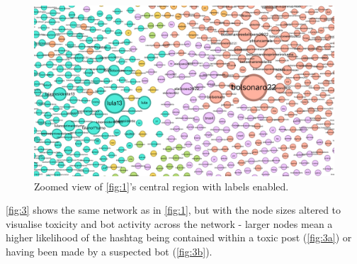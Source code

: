 \documentclass[a4paper,11pt]{article}  %
\begin{document}
	\begin{figure}%
		\centering
		\includegraphics[height=0.3\textheight]{images/net_mod_app_detail}
		\caption{Zoomed view of \autoref{fig:1}'s central region with labels enabled.}
		\label{fig:2}
	\end{figure}

	\autoref{fig:3} shows the same network as in \autoref{fig:1}, but with the node sizes altered to visualise toxicity and bot activity across the network - larger nodes mean a higher likelihood of the hashtag being contained within a toxic post (\autoref{fig:3a}) or having been made by a suspected bot (\autoref{fig:3b}). 
	
\end{document}
